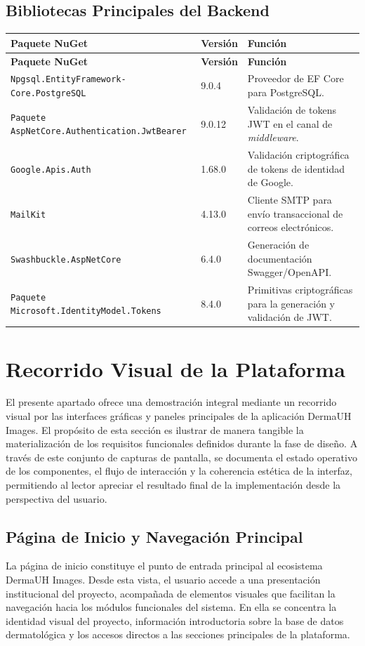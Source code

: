 \subsection{Bibliotecas Principales del Backend}
\begin{longtable}{|p{6cm}|p{1.5cm}|p{8cm}|}
\hline
\textbf{Paquete NuGet} & \textbf{Versión} & \textbf{Función} \\
\hline
\endfirsthead
\hline
\textbf{Paquete NuGet} & \textbf{Versión} & \textbf{Función} \\
\hline
\endhead
\texttt{Npgsql.EntityFramework-Core.PostgreSQL}~\cite{npgsql_docs} & 9.0.4 & Proveedor de EF Core para 
PostgreSQL. \\
\hline
\texttt{Paquete AspNetCore.Authentication.JwtBearer} & 9.0.12 & Validación de tokens JWT en el 
canal de \textit{middleware}. \\
\hline
\texttt{Google.Apis.Auth} & 1.68.0 & Validación criptográfica de tokens de identidad de Google. \\
\hline
\texttt{MailKit}~\cite{mailkit_docs} & 4.13.0 & Cliente SMTP para envío transaccional de correos electrónicos. \\
\hline
\texttt{Swashbuckle.AspNetCore}~\cite{swagger_docs} & 6.4.0 & Generación de documentación Swagger/OpenAPI. \\
\hline
\texttt{Paquete Microsoft.IdentityModel.Tokens} & 8.4.0 & Primitivas criptográficas para la generación y validación de JWT. \\
\hline
\end{longtable}

\section{Recorrido Visual de la Plataforma}
El presente apartado ofrece una demostración integral mediante un recorrido visual por las interfaces 
gráficas y paneles principales de la aplicación DermaUH Images. El propósito de esta sección es ilustrar de 
manera tangible la materialización de los requisitos funcionales definidos durante la fase de diseño. A través 
de este conjunto de capturas de pantalla, se documenta el estado operativo de los componentes, el flujo de 
interacción y la coherencia estética de la interfaz, permitiendo al lector apreciar el resultado final 
de la implementación desde la perspectiva del usuario.

\subsection{Página de Inicio y Navegación Principal}
La página de inicio constituye el punto de entrada principal al ecosistema DermaUH Images. Desde esta
vista, el usuario accede a una presentación institucional del proyecto, acompañada de elementos visuales
que facilitan la navegación hacia los módulos funcionales del sistema. En ella se concentra la identidad
visual del proyecto, información introductoria sobre la base de datos dermatológica y los accesos directos
a las secciones principales de la plataforma.

